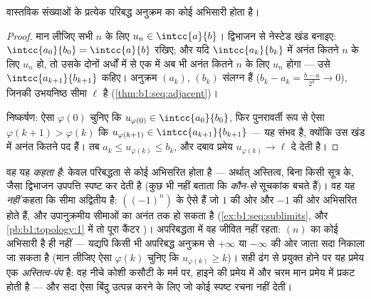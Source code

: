 \begin{theorem}[बोल्ज़ानो--वाइरश्ट्रास]\label{thm:b1:seq:bw}
वास्तविक संख्याओं के प्रत्येक परिबद्ध अनुक्रम का कोई अभिसारी  होता
है।
\end{theorem}

\begin{proof}
मान लीजिए सभी $n$ के लिए $u_n \in \intcc{a}{b}$। द्विभाजन से नेस्टेड खंड
बनाइए: $\intcc{a_0}{b_0} = \intcc{a}{b}$ रखिए; और यदि $\intcc{a_k}{b_k}$ में
अनंत कितने $n$ के लिए $u_n$ हो, तो उसके दोनों अर्धों में से एक में अब भी
अनंत कितने $n$ के लिए $u_n$ होगा --- उसे $\intcc{a_{k+1}}{b_{k+1}}$ कहिए।
अनुक्रम $(a_k)$, $(b_k)$ संलग्न हैं ($b_k - a_k = \frac{b-a}{2^k} \to 0$),
जिनकी उभयनिष्ठ सीमा $\ell$ है (\cref{thm:b1:seq:adjacent})।

निष्कर्षण: ऐसा $\varphi(0)$ चुनिए कि $u_{\varphi(0)} \in \intcc{a_0}{b_0}$,
फिर पुनरावर्ती रूप से ऐसा $\varphi(k+1) > \varphi(k)$ कि $u_{\varphi(k+1)}
\in \intcc{a_{k+1}}{b_{k+1}}$ --- यह संभव है, क्योंकि उस खंड में अनंत कितने
पद हैं। तब $a_k \leq u_{\varphi(k)} \leq b_k$, और दबाव प्रमेय
$u_{\varphi(k)} \to \ell$ दे देती है।
\end{proof}

\begin{remark}
वह यह \emph{कहता है}: केवल परिबद्धता से कोई  अभिसरित होता है ---
अर्थात् अस्तित्व, बिना किसी सूत्र के, जैसा द्विभाजन उपपत्ति स्पष्ट कर देती
है (कुछ भी नहीं बताता कि \emph{कौन-से} सूचकांक बचते हैं)। वह यह \emph{नहीं}
कहता कि सीमा अद्वितीय है: $((-1)^n)$ के ऐसे  हैं जो $1$ की ओर और
$-1$ की ओर अभिसरित होते हैं, और उपानुक्रमीय सीमाओं का  अनंत तक हो
सकता है (\cref{ex:b1:seq:sublimits}, और \cref{pb:b1:topology:1} में तो पूरा
कैंटर )। अपरिबद्धता में वह जीवित नहीं रहता: $(n)$ का कोई अभिसारी
 है ही नहीं --- यद्यपि किसी भी अपरिबद्ध अनुक्रम से $+\infty$ या
$-\infty$ की ओर जाता  सदा निकाला जा सकता है (मान लीजिए ऐसा
$\varphi(k)$ चुनिए कि $u_{\varphi(k)} \geq k$)। सही ढंग से प्रयुक्त होने पर
यह प्रमेय एक \emph{अस्तित्व-पंप} है: वह नीचे कोशी कसौटी के मर्म पर, हाइने की
प्रमेय में और चरम मान प्रमेय में प्रकट होती है --- और सदा ऐसा बिंदु उत्पन्न
करने के लिए जो कोई स्पष्ट रचना नहीं देती।
\end{remark}

